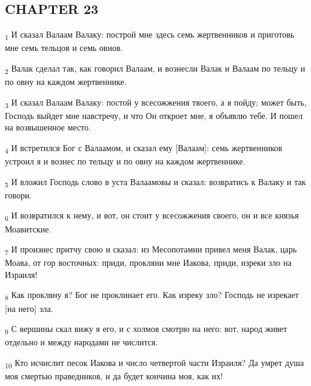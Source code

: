 \subsection{CHAPTER 23}
\begin{tcolorbox}
\textsubscript{1} И сказал Валаам Валаку: построй мне здесь семь жертвенников и приготовь мне семь тельцов и семь овнов.
\end{tcolorbox}
\begin{tcolorbox}
\textsubscript{2} Валак сделал так, как говорил Валаам, и вознесли Валак и Валаам по тельцу и по овну на каждом жертвеннике.
\end{tcolorbox}
\begin{tcolorbox}
\textsubscript{3} И сказал Валаам Валаку: постой у всесожжения твоего, а я пойду; может быть, Господь выйдет мне навстречу, и что Он откроет мне, я объявлю тебе. И пошел на возвышенное место.
\end{tcolorbox}
\begin{tcolorbox}
\textsubscript{4} И встретился Бог с Валаамом, и сказал ему [Валаам]: семь жертвенников устроил я и вознес по тельцу и по овну на каждом жертвеннике.
\end{tcolorbox}
\begin{tcolorbox}
\textsubscript{5} И вложил Господь слово в уста Валаамовы и сказал: возвратись к Валаку и так говори.
\end{tcolorbox}
\begin{tcolorbox}
\textsubscript{6} И возвратился к нему, и вот, он стоит у всесожжения своего, он и все князья Моавитские.
\end{tcolorbox}
\begin{tcolorbox}
\textsubscript{7} И произнес притчу свою и сказал: из Месопотамии привел меня Валак, царь Моава, от гор восточных: приди, прокляни мне Иакова, приди, изреки зло на Израиля!
\end{tcolorbox}
\begin{tcolorbox}
\textsubscript{8} Как прокляну я? Бог не проклинает его. Как изреку зло? Господь не изрекает [на него] зла.
\end{tcolorbox}
\begin{tcolorbox}
\textsubscript{9} С вершины скал вижу я его, и с холмов смотрю на него: вот, народ живет отдельно и между народами не числится.
\end{tcolorbox}
\begin{tcolorbox}
\textsubscript{10} Кто исчислит песок Иакова и число четвертой части Израиля? Да умрет душа моя смертью праведников, и да будет кончина моя, как их!
\end{tcolorbox}
